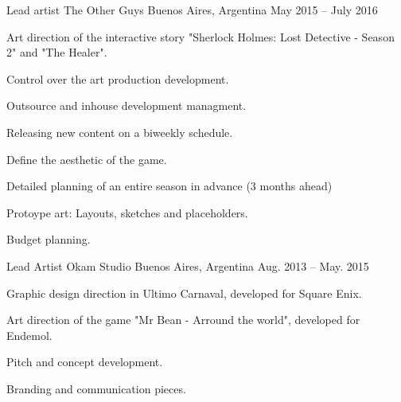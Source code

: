 

\begin{cventries}

  \cventry
      {Lead artist} %
      {The Other Guys} %
      {Buenos Aires, Argentina} %
      {May 2015 – July 2016} %
      {
        \begin{cvitems} %
          \item {Art direction of the interactive story "Sherlock Holmes: Lost Detective - Season 2" and "The Healer".}
          \item {Control over the art production development.}
          \item {Outsource and inhouse development managment.}
          \item {Releasing new content on a biweekly schedule.}
          \item {Define the aesthetic of the game.}
          \item {Detailed planning of an entire season in advance (3 months ahead)}
          \item {Protoype art: Layouts, sketches and placeholders.}
          \item {Budget planning.}
        \end{cvitems}
      }


  \cventry
    {Lead Artist} %
    {Okam Studio} %
    {Buenos Aires, Argentina} %
    {Aug. 2013 – May. 2015} %
    {
      \begin{cvitems} %
        \item {Graphic design direction in Ultimo Carnaval, developed for Square Enix.}
        \item {Art direction of the game "Mr Bean - Arround the world", developed for Endemol.}
        \item {Pitch and concept development.}
        \item {Branding and communication pieces.}
      \end{cvitems}
    }


\end{cventries}
